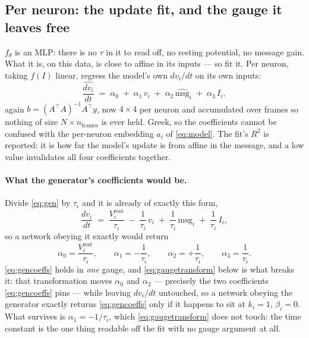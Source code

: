 \documentclass[11pt,a4paper]{article}
\newcommand{\vi}{v_i}
\newcommand{\msg}{\mathrm{msg}}
\begin{document}
\subsection{Per neuron: the update fit, and the gauge it leaves free}
\label{sec:update}
\label{sec:gauge}

$f_\theta$ is an MLP: there is no $\tau$ in it to read off, no resting potential,
no message gain. What it is, on this data, is close to affine in its inputs --- so
fit it. Per neuron, taking $f(I)$ linear, regress the model's own $d\vi/dt$ on its
own inputs:
%
\begin{equation}
\widehat{\frac{d\vi}{dt}} \;=\;
   \alpha_0 \;+\; \alpha_1\,\vi \;+\; \alpha_2\,\widehat{\msg}_i
   \;+\; \alpha_3\,I_i ,
\label{eq:updatesolve}
\end{equation}
%
again $b = (A^{\!\top}\!A)^{-1}A^{\!\top}y$, now $4\times4$ per neuron and
accumulated over frames so nothing of size $N \times n_{\mathrm{frames}}$ is ever
held. Greek, so the coefficients cannot be confused with the per-neuron embedding
$a_i$ of \eqref{eq:model}. The fit's $R^2$ is reported: it is how far the model's
update is from affine in the message, and a low value invalidates all four
coefficients together.

\paragraph{What the generator's coefficients would be.} Divide \eqref{eq:gen} by
$\tau_i$ and it is already of exactly this form,
%
\begin{equation}
\frac{d\vi}{dt} \;=\; \frac{V^{\mathrm{rest}}_i}{\tau_i}
   \;-\; \frac{1}{\tau_i}\,\vi
   \;+\; \frac{1}{\tau_i}\,\msg_i
   \;+\; \frac{1}{\tau_i}\,I_i ,
\label{eq:genexpanded}
\end{equation}
%
so a network obeying it exactly would return
%
\begin{equation}
\alpha_0 = \frac{V^{\mathrm{rest}}_i}{\tau_i}, \qquad
\alpha_1 = -\frac{1}{\tau_i}, \qquad
\alpha_2 = +\frac{1}{\tau_i}, \qquad
\alpha_3 = \frac{1}{\tau_i} .
\label{eq:gencoeffs}
\end{equation}
%
\eqref{eq:gencoeffs} holds in \emph{one} gauge, and \eqref{eq:gaugetransform}
below is what breaks it: that transformation moves $\alpha_0$ and $\alpha_2$ ---
precisely the two coefficients \eqref{eq:gencoeffs} pins --- while leaving
$d\vi/dt$ untouched, so a network obeying the generator exactly returns
\eqref{eq:gencoeffs} only if it happens to sit at $k_i = 1$, $\beta_i = 0$.
What survives is $\alpha_1 = -1/\tau_i$, which \eqref{eq:gaugetransform} does not
touch: the time constant is the one thing readable off the fit with no gauge
argument at all.
\end{document}
